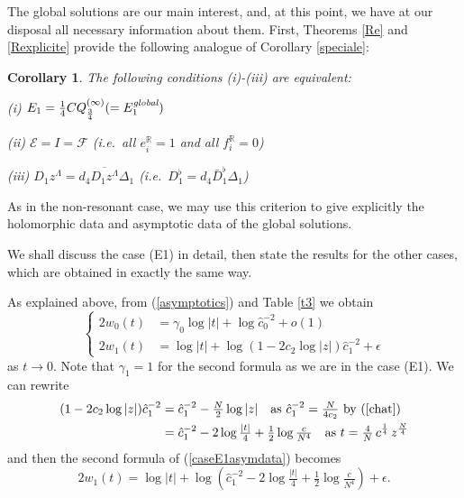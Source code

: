 \documentclass[a4paper,12pt,leqno]{amsart}
\numberwithin{equation}{section}
\theoremstyle{plain}
\newtheorem{corollary}[theorem]{Corollary}
\theoremstyle{definition}
\newcommand{\R}{\mathbb R}
\newcommand{\ga}{\gamma}
\newcommand{\eps}{\epsilon}
\newcommand{\De}{\Delta}
\newcommand{\no}{\noindent}
\newcommand{\Qi}{  Q^{(\infty)}  }
\newcommand{\MM}{\Lambda}
\begin{document}
{The global solutions are our main interest, and, at this point, we have at our disposal all necessary information about them.
First, Theorems \ref{Re} and \ref{Rexplicite} provide the following analogue of Corollary \ref{speciale}:

\begin{corollary}\label{Rspeciale}  The following conditions (i)-(iii) are equivalent:

\no (i) $E_1 = \tfrac14C \Qi_{\frac34} (= E_1^{\text{\em global}})$

\no (ii) $\mathcal E=I=\mathcal F$ (i.e.\ all $e_i^\R=1$ and all $f_i^\R=0$)

\no (iii) $D_1z^\MM= d_4 \overline{D_1z^\MM} \De_1$
(i.e.\ $D_1^\flat = d_4 \bar D_1^\flat \De_1$)
\end{corollary}

As in the non-resonant case, we may use this criterion to give explicitly the holomorphic data and asymptotic data of the global solutions. 

We shall discuss the case (E1) in detail, then state the results for the other cases, which are obtained in exactly the same way.  

As explained above, from (\ref{asymptotics}) and Table \ref{t3} we obtain
\begin{equation}\label{caseE1asymdata}
\begin{cases}
2w_0(t)&= \ga_0 \log\vert t\vert + \log  \hat c_0^{-2}
+o(1)
\\
2w_1(t)&= \log\vert t\vert + \log \left(
1-2c_2\log \vert z\vert
\right)\hat c_1^{-2}
+\eps
\end{cases}
\end{equation}
as $t\to 0$.  Note that $\ga_1=1$ for the second formula as we are in the case (E1).  We can rewrite
\begin{align*}
(1-2c_2\log \vert z\vert)\hat c_1^{-2}
&= \hat c_1^{-2} -\tfrac N2 \log \vert z\vert
\quad
\text{as $\hat c_1^{-2}=\tfrac N{4c_2}$ by (\ref{chat})}
\\
&= \hat c_1^{-2} - 2\log\tfrac{\vert t\vert}{4} +\tfrac12 \log \tfrac{c}{N^4}
\quad
\text{as $t=\tfrac{4}N \, c^{\frac1{4}} \, z^{\frac N{4}}$}
\end{align*}
and then the second formula of (\ref{caseE1asymdata}) becomes
\[
2w_1(t)= \log\vert t\vert + \log \left(
\hat c_1^{-2} - 2\log\tfrac{\vert t\vert}{4} +\tfrac12 \log \tfrac{c}{N^4}
\right)
+\eps.
\]

}
\end{document}

